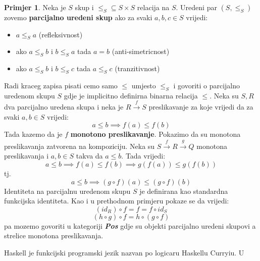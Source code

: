 \documentclass[11pt]{article}
\newcommand{\category}[1]{\textbf{\emph{#1}}}
\theoremstyle{definition}
\newtheorem{primjer}{Primjer}
\begin{document}
  \begin{primjer}
    Neka je $S$ skup i $\leq_S \subseteq S \times S$ relacija na $S$. Uredeni par $(S,
    \leq_S)$ zovemo \textbf{parcijalno uredeni skup} ako za svaki $a, b, c \in S$
    vrijedi:
    \begin{itemize}
      \item $a \leq_S a$ (refleksivnost)
      \item ako $a \leq_S b$ i $b \leq_S a$ tada $a = b$ (anti-simetricnost)
      \item ako $a \leq_S b$ i $b \leq_S c$ tada $a \leq_S c$ (tranzitivnost)
    \end{itemize}
    Radi kraceg zapisa pisati cemo samo $\leq$ umjesto $\leq_S$ i
  govoriti o parcijalno uredenom skupu $S$ gdje je implicitno definirna
  binarna relacija $\leq$.
  Neka su $S, R$ dva parcijalno uredena skupa i neka je $R \xrightarrow{f} S$
  preslikavanje za koje vrijedi da za svaki $a, b \in S$ vrijedi:
  \begin{equation*}
    a \leq b \implies f(a) \leq f(b)
  \end{equation*}
  Tada kazemo da je $f$ \textbf{monotono preslikavanje}.
  Pokazimo da su monotona preslikavanja zatvorena na kompoziciju.
  Neka su $S \xrightarrow{f} R \xrightarrow{g} Q$ monotona preslikavanja i $a,
  b \in S$ takva da $a \leq b$. Tada vrijedi:
  \begin{equation*}
    a \leq b \implies f(a) \leq f(b) \implies g(f(a)) \leq g(f(b))
  \end{equation*}
  tj.
  \begin{equation*}
    a \leq b \implies (g \circ f)(a) \leq (g \circ f)(b)
  \end{equation*}
  Identiteta na parcijalnu uredenom skupu $S$ je definirana kao standardna
  funkcijska identiteta. Kao i u prethodnom primjeru pokaze se da vrijedi:
  \begin{equation*}
    (id_R) \circ f = f = f \circ id_S
  \end{equation*}
  \begin{equation*}
    (h \circ g) \circ f = h \circ (g \circ f)
  \end{equation*}
  pa mozemo govoriti u kategoriji \category{Pos} gdje su objekti parcijalno
  uredeni skupovi a strelice monotona preslikavanja.
  \end{primjer}
  Haskell je funkcijski programski jezik nazvan po logicaru Haskellu Curryiu. U
\end{document}
